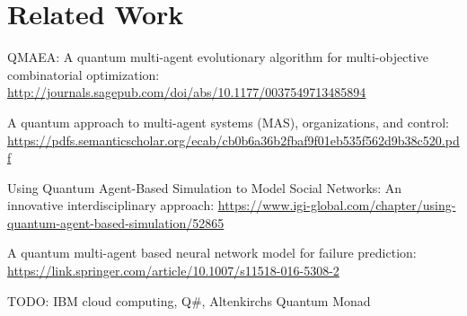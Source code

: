 \section{Related Work}
\label{sec:related_work}

QMAEA: A quantum multi-agent evolutionary algorithm for multi-objective combinatorial optimization: \url{http://journals.sagepub.com/doi/abs/10.1177/0037549713485894}

A quantum approach to multi-agent systems (MAS), organizations, and
control: \url{https://pdfs.semanticscholar.org/ecab/cb0b6a36b2fbaf9f01eb535f562d9b38c520.pdf}

Using Quantum Agent-Based Simulation to Model Social Networks: An innovative interdisciplinary approach: \url{https://www.igi-global.com/chapter/using-quantum-agent-based-simulation/52865}

A quantum multi-agent based neural network model for failure prediction: \url{https://link.springer.com/article/10.1007/s11518-016-5308-2}

TODO: IBM cloud computing, Q\#, Altenkirchs Quantum Monad